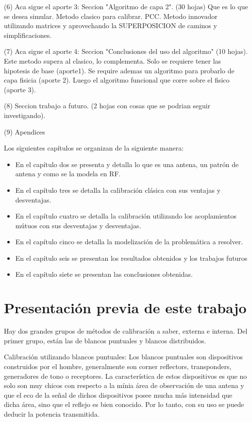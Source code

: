  (6) Aca sigue el aporte 3: Seccion "Algoritmo de capa 2". (30 hojas)
 Que es lo que se desea simular.
 Metodo clasico para calibrar. PCC.
 Metodo innovador utilizando matrices y aprovechando la SUPERPOSICION de caminos y simplificaciones.
 
 (7) Aca sigue el aporte 4: Seccion "Conclusiones del uso del algoritmo" (10 hojas).
 Este metodo supera al clasico, lo complementa. Solo se requiere tener las hipotesis de base (aporte1). Se require ademas un algoritmo para probarlo de capa fisicia (aporte 2). Luego el algoritmo funcional que corre sobre el fisico (aporte 3).
 
 (8) Seccion trabajo a futuro. (2 hojas con cosas que se podrian seguir investigando).
 
 (9) Apendices


Los siguientes capítulos se organizan de la siguiente manera: 
\begin{itemize}
	\item En el capítulo dos se presenta y detalla lo que es una antena, un patrón de antena y como se la modela en RF.
	\item En el capítulo tres se detalla la calibración clásica con sus ventajas y desventajas.
	\item En el capítulo cuatro se detalla la calibración utilizando los acoplamientos mútuos con sus desventajas y desventajas.
	\item En el capítulo cinco se detalla la modelización de la problemática a resolver. 
	\item En el capítulo seis se presentan los resultados obtenidos y los trabajos futuros 
	\item En el capítulo siete se presentan las conclusiones obtenidas.
\end{itemize}


\section{Presentación previa de este trabajo}

Hay dos grandes grupos de métodos de calibración a saber, externa e interna. Del primer grupo, están las de blancos 
puntuales y blancos distribuidos.

Calibración utilizando blancos puntuales: Los blancos puntuales son dispositivos construidos por el hombre, generalmente son
corner reflectors, transponders, generadores de tono o receptores. La característica de estos dispositivos es que no solo 
son muy chicos con respecto a la mínia área de observación de una antena y que el eco de la señal de dichos dispositivos 
posee mucha más intensidad que dicha área, sino que el reflejo es bien conocido. Por lo tanto, con su uso se puede deducir la potencia transmitida.

